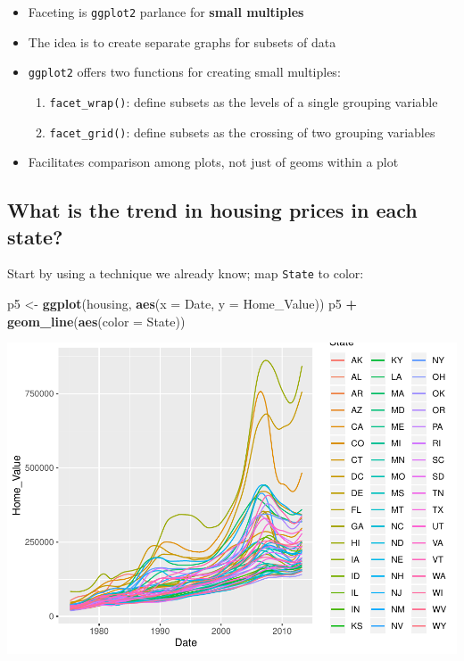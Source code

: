 \documentclass[]{book}
\newenvironment{Shaded}{\begin{snugshade}}{\end{snugshade}}
\newcommand{\DataTypeTok}[1]{\textcolor[rgb]{0.13,0.29,0.53}{#1}}
\newcommand{\KeywordTok}[1]{\textcolor[rgb]{0.13,0.29,0.53}{\textbf{#1}}}
\newcommand{\NormalTok}[1]{#1}
\newcommand{\OperatorTok}[1]{\textcolor[rgb]{0.81,0.36,0.00}{\textbf{#1}}}
\newcommand{\StringTok}[1]{\textcolor[rgb]{0.31,0.60,0.02}{#1}}
\providecommand{\tightlist}{%
  \setlength{\itemsep}{0pt}\setlength{\parskip}{0pt}}
\begin{document}
\begin{itemize}
\tightlist
\item
  Faceting is \texttt{ggplot2} parlance for \textbf{small multiples}
\item
  The idea is to create separate graphs for subsets of data
\item
  \texttt{ggplot2} offers two functions for creating small multiples:

  \begin{enumerate}
  \def\labelenumi{\arabic{enumi}.}
  \tightlist
  \item
    \texttt{facet\_wrap()}: define subsets as the levels of a single grouping variable
  \item
    \texttt{facet\_grid()}: define subsets as the crossing of two grouping variables
  \end{enumerate}
\item
  Facilitates comparison among plots, not just of geoms within a plot
\end{itemize}

\hypertarget{what-is-the-trend-in-housing-prices-in-each-state}{%
\subsection{What is the trend in housing prices in each state?}\label{what-is-the-trend-in-housing-prices-in-each-state}}

Start by using a technique we already know; map \texttt{State} to color:

\begin{Shaded}
\begin{Highlighting}[]
\NormalTok{p5 <-}\StringTok{ }\KeywordTok{ggplot}\NormalTok{(housing, }\KeywordTok{aes}\NormalTok{(}\DataTypeTok{x =}\NormalTok{ Date, }\DataTypeTok{y =}\NormalTok{ Home_Value))}
\NormalTok{p5 }\OperatorTok{+}\StringTok{ }\KeywordTok{geom_line}\NormalTok{(}\KeywordTok{aes}\NormalTok{(}\DataTypeTok{color =}\NormalTok{ State))  }
\end{Highlighting}
\end{Shaded}

\includegraphics{R/Rgraphics/figures/unnamed-chunk-192-1.pdf}
\end{document}
